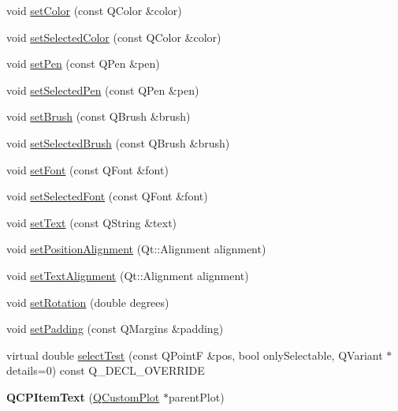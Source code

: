 \begin{DoxyCompactItemize}
\item 
void \hyperlink{class_q_c_p_item_text_aa51efc0841fe52da9eaf8aff6fc8a8b2}{set\+Color} (const Q\+Color \&color)
\item 
void \hyperlink{class_q_c_p_item_text_ae7ba0bdb75c897b028388e45bfd435fa}{set\+Selected\+Color} (const Q\+Color \&color)
\item 
void \hyperlink{class_q_c_p_item_text_a9b9ec6eea0eb0603977ff84d4c78d0a3}{set\+Pen} (const Q\+Pen \&pen)
\item 
void \hyperlink{class_q_c_p_item_text_a291febe586f0da3f1c392e77bef4aa20}{set\+Selected\+Pen} (const Q\+Pen \&pen)
\item 
void \hyperlink{class_q_c_p_item_text_a1c7e131516df2ed8d941ef31240ded8e}{set\+Brush} (const Q\+Brush \&brush)
\item 
void \hyperlink{class_q_c_p_item_text_a6b8377eeb2af75eb9528422671ac16cb}{set\+Selected\+Brush} (const Q\+Brush \&brush)
\item 
void \hyperlink{class_q_c_p_item_text_a94ad60ebe04f5c07c35e7c2029e96b1f}{set\+Font} (const Q\+Font \&font)
\item 
void \hyperlink{class_q_c_p_item_text_a0be2841772f83663c4db307928b82816}{set\+Selected\+Font} (const Q\+Font \&font)
\item 
void \hyperlink{class_q_c_p_item_text_a3dacdda0ac88f99a05b333b977c48747}{set\+Text} (const Q\+String \&text)
\item 
void \hyperlink{class_q_c_p_item_text_a781cdf8c640fc6a055dcff1e675c8c7a}{set\+Position\+Alignment} (Qt\+::\+Alignment alignment)
\item 
void \hyperlink{class_q_c_p_item_text_ab5bc0684c4d1bed81949a11b34dba478}{set\+Text\+Alignment} (Qt\+::\+Alignment alignment)
\item 
void \hyperlink{class_q_c_p_item_text_a4bcc10cd97952c3f749d75824b5077f0}{set\+Rotation} (double degrees)
\item 
void \hyperlink{class_q_c_p_item_text_aeea8a3e01f135f9dd0bb08f51db66310}{set\+Padding} (const Q\+Margins \&padding)
\item 
virtual double \hyperlink{class_q_c_p_item_text_a676aaec10ad3cc4d7d0e4847db04c838}{select\+Test} (const Q\+PointF \&pos, bool only\+Selectable, Q\+Variant $\ast$details=0) const Q\+\_\+\+D\+E\+C\+L\+\_\+\+O\+V\+E\+R\+R\+I\+DE
\item 
{\bfseries Q\+C\+P\+Item\+Text} (\hyperlink{class_q_custom_plot}{Q\+Custom\+Plot} $\ast$parent\+Plot)\hypertarget{class_q_c_p_item_text_a77ff96a2972a00872ff8f8c67143abbe}{}\label{class_q_c_p_item_text_a77ff96a2972a00872ff8f8c67143abbe}


\end{DoxyCompactItemize}
